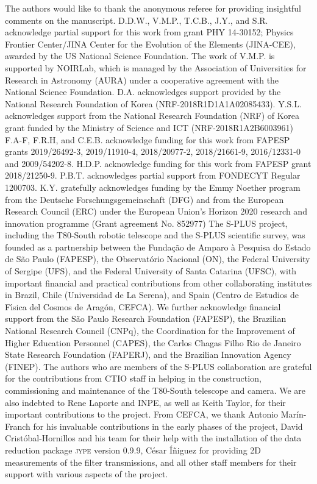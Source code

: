 \documentclass[twocolumn,trackchanges]{aastex63}
\begin{document}
The authors would like to thank the anonymous referee for providing insightful comments on the manuscript. 
%
D.D.W., V.M.P., T.C.B., J.Y., and S.R. acknowledge partial support for this work from grant PHY 14-30152; Physics Frontier Center/JINA Center for the Evolution of the Elements (JINA-CEE), awarded by the US National Science Foundation. 
%
The work of V.M.P. is supported by NOIRLab, which is managed by the
Association of Universities for Research in Astronomy (AURA) under a
cooperative agreement with the National Science Foundation.
%
D.A. acknowledges support provided by the National Research Foundation of Korea (NRF-2018R1D1A1A02085433). 
%
Y.S.L. acknowledges support from the National Research Foundation
(NRF) of Korea grant funded by the Ministry of Science and ICT (NRF-2018R1A2B6003961)
%
F.A-F, F.R.H, and C.E.B. acknowledge funding for this work from FAPESP grants 2019/26492-3, 2019/11910-4, 2018/20977-2, 2018/21661-9, 2016/12331-0 and 2009/54202-8.
%
H.D.P. acknowledge funding for this work from FAPESP grant 2018/21250-9.
%
P.B.T. acknowledges partial support from FONDECYT Regular 1200703.
%
K.Y. gratefully acknowledges funding by the Emmy Noether program from the Deutsche Forschungsgemeinschaft (DFG) and from the European Research Council (ERC) under the European Union’s Horizon 2020 research and innovation programme (Grant agreement No. 852977)
%
The S-PLUS project, including the T80-South robotic telescope and the S-PLUS scientific survey, was founded as a partnership between the Funda\c{c}\~{a}o de Amparo \`{a} Pesquisa do Estado de S\~{a}o Paulo (FAPESP), the Observat\'{o}rio Nacional (ON), the Federal University of Sergipe (UFS), and the Federal University of Santa Catarina (UFSC), with important financial and practical contributions from other collaborating institutes in Brazil, Chile (Universidad de La Serena), and Spain (Centro de Estudios de F\'{\i}sica del Cosmos de Arag\'{o}n, CEFCA). We further acknowledge financial support from the São Paulo Research Foundation (FAPESP), the Brazilian National Research Council (CNPq), the Coordination for the Improvement of Higher Education Personnel (CAPES), the Carlos Chagas Filho Rio de Janeiro State Research Foundation (FAPERJ), and the Brazilian Innovation Agency (FINEP).
%
The authors who are members of the S-PLUS collaboration are grateful for the contributions from CTIO staff in helping in the construction, commissioning and maintenance of the T80-South telescope and camera. We are also indebted to Rene Laporte and INPE, as well as Keith Taylor, for their important contributions to the project. 
%
From CEFCA, we thank Antonio Mar\'{i}n-Franch for his invaluable contributions in the early phases of the project, David Crist{\'o}bal-Hornillos and his team for their help with the installation of the data reduction package \textsc{jype} version 0.9.9, C\'{e}sar \'{I}\~{n}iguez for providing 2D measurements of the filter transmissions, and all other staff members for their support with various aspects of the project. 
\end{document}
